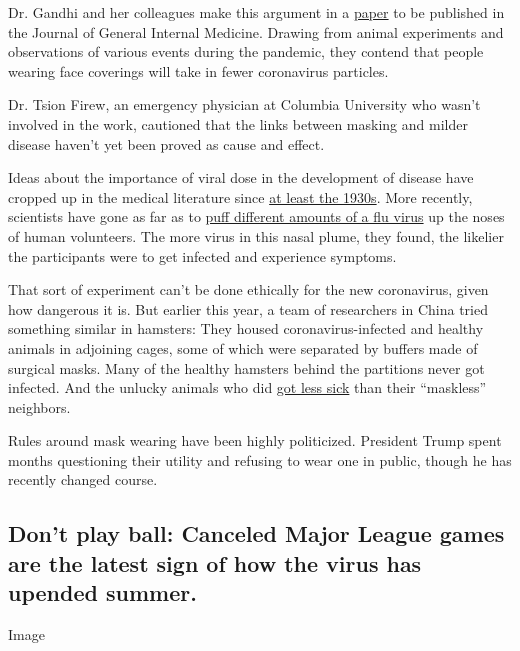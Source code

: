 Dr. Gandhi and her colleagues make this argument in a
\href{https://ucsf.app.box.com/s/blvolkp5z0mydzd82rjks4wyleagt036}{paper}
to be published in the Journal of General Internal Medicine. Drawing
from animal experiments and observations of various events during the
pandemic, they contend that people wearing face coverings will take in
fewer coronavirus particles.

Dr. Tsion Firew, an emergency physician at Columbia University who
wasn't involved in the work, cautioned that the links between masking
and milder disease haven't yet been proved as cause and effect.

Ideas about the importance of viral dose in the development of disease
have cropped up in the medical literature since
\href{https://academic.oup.com/aje/article-abstract/27/3/493/99616}{at
least the 1930s}. More recently, scientists have gone as far as to
\href{https://pubmed.ncbi.nlm.nih.gov/25416753/}{puff different amounts
of a flu virus} up the noses of human volunteers. The more virus in this
nasal plume, they found, the likelier the participants were to get
infected and experience symptoms.

That sort of experiment can't be done ethically for the new coronavirus,
given how dangerous it is. But earlier this year, a team of researchers
in China tried something similar in hamsters: They housed
coronavirus-infected and healthy animals in adjoining cages, some of
which were separated by buffers made of surgical masks. Many of the
healthy hamsters behind the partitions never got infected. And the
unlucky animals who did
\href{https://academic.oup.com/cid/article/doi/10.1093/cid/ciaa644/5848814}{got
less sick} than their ``maskless'' neighbors.

Rules around mask wearing have been highly politicized. President Trump
spent months questioning their utility and refusing to wear one in
public, though he has recently changed course.

\hypertarget{dont-play-ball-canceled-major-league-games-are-the-latest-sign-of-how-the-virus-has-upended-summer}{%
\subsection{Don't play ball: Canceled Major League games are the latest
sign of how the virus has upended
summer.}\label{dont-play-ball-canceled-major-league-games-are-the-latest-sign-of-how-the-virus-has-upended-summer}}

Image

